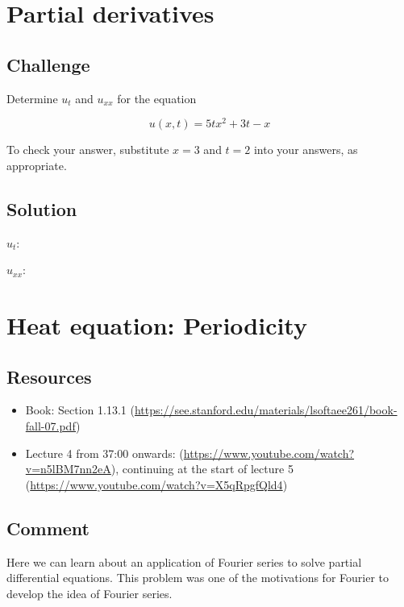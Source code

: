 \newpage
\section{Partial derivatives}

\subsection*{Challenge}
Determine $u_t$ and $u_{xx}$ for the equation

\begin{equation}
    u(x,t) = 5tx^2 + 3t - x
\end{equation}

To check your answer, substitute $x=3$ and $t=2$ into your answers, as appropriate.

\subsection*{Solution}
$u_t$:\\

$u_{xx}$:\\




\newpage
\section{Heat equation: Periodicity}

\subsection*{Resources}
\begin{itemize}
    \item Book: Section 1.13.1 (\url{https://see.stanford.edu/materials/lsoftaee261/book-fall-07.pdf})
    \item Lecture 4 from 37:00 onwards: (\url{https://www.youtube.com/watch?v=n5lBM7nn2eA}), continuing at the start of lecture 5 (\url{https://www.youtube.com/watch?v=X5qRpgfQld4})
\end{itemize}

\subsection*{Comment}
Here we can learn about an application of Fourier series to solve partial differential equations. This problem was one of the motivations for Fourier to develop the idea of Fourier series.

